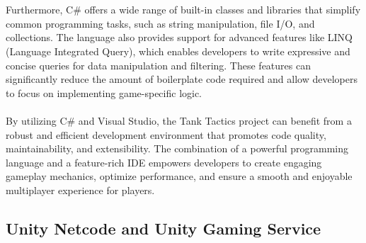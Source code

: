 \\
\noindent
\\
Furthermore, C\# offers a wide range of built-in classes and libraries that simplify common programming tasks, such as string manipulation, file I/O, and collections. The language also provides support for advanced features like LINQ (Language Integrated Query), which enables developers to write expressive and concise queries for data manipulation and filtering. These features can significantly reduce the amount of boilerplate code required and allow developers to focus on implementing game-specific logic.
\\
\noindent
\\
By utilizing C\# and Visual Studio, the Tank Tactics project can benefit from a robust and efficient development environment that promotes code quality, maintainability, and extensibility. The combination of a powerful programming language and a feature-rich IDE empowers developers to create engaging gameplay mechanics, optimize performance, and ensure a smooth and enjoyable multiplayer experience for players.

\subsection{Unity Netcode and Unity Gaming Service}

